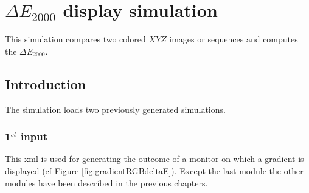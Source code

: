 \chapter{$\Delta{E_{2000}}$ display simulation}
\minitoc{}

This simulation compares two colored $XYZ$ images or sequences and computes the $\Delta{E_{2000}}$.

\section{Introduction}

The simulation loads two previously generated simulations.

\subsection{1$^{st}$ input}

This xml is used for generating the outcome of a monitor on which a gradient is displayed (cf Figure \ref{fig:gradientRGBdeltaE}). Except the last module the other modules have been described in the previous chapters.

